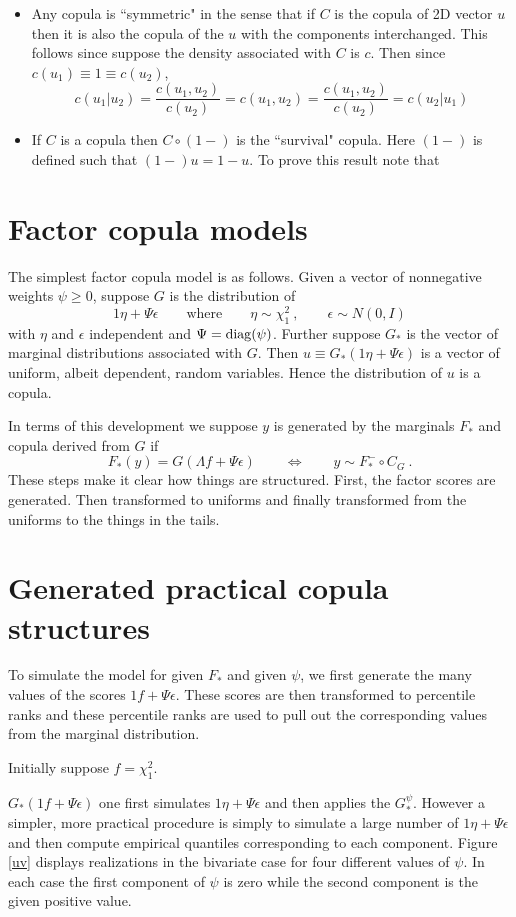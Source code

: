 \documentclass[a4paper,12pt]{article}
\newcommand{\eps}{\epsilon}
\newcommand{\diag}{{\rm diag}}
\begin{document}
\begin{itemize}
\item  Any copula is ``symmetric" in the sense that if $C$ is the copula of 2D vector $u$ then it is also the copula of the $u$ with the components interchanged.  This follows since suppose the density associated with $C$ is $c$.   Then since $c(u_1)\equiv 1\equiv c(u_2)$,
$$
c(u_1|u_2) = \frac{c(u_1,u_2)}{c(u_2)} =c(u_1,u_2) =\frac{c(u_1,u_2)}{c(u_2)}= c(u_2|u_1)
$$

\item If $C$ is a copula then $C\circ (1-)$ is the ``survival" copula.  Here $(1-)$ is defined such that $(1-)u=1-u$.  To prove this result note that
\end{itemize}

\section{Factor copula models}
The simplest factor copula model is as follows. Given a vector of nonnegative weights $\psi\ge 0$, suppose $G$ is the distribution of
$$
1\eta+\Psi\eps\qquad\mathrm{where}\qquad \eta\sim\chi^2_1\ , \qquad \eps\sim N(0,I)
$$ with $\eta$ and $\eps$ independent and $\Psi=\diag(\psi)$.  Further suppose $G_*$ is the vector of marginal distributions associated with $G$.   Then $u\equiv G_*(1\eta+\Psi\eps)$ is a vector of uniform, albeit dependent, random variables. Hence the distribution of  $u$ is a copula.

In terms of this development we suppose $y$ is generated by the marginals $F_*$ and copula derived from $G$ if
$$
F_*(y) =  G(\Lambda f +\Psi\eps)\qquad\Leftrightarrow\qquad y\sim F_*^-\circ C_G \ .
$$
These steps make it clear how things are structured.  First, the factor scores are generated.  Then transformed to uniforms and finally transformed from the uniforms to the things in the tails.

\section{Generated practical copula structures}
To simulate the model for given $F_*$ and given $\psi$, we first generate the many values of the scores $1f+\Psi\eps$. These scores are then transformed to percentile ranks and these percentile ranks are used to pull out the corresponding values from the marginal distribution.

Initially suppose $f=\chi^2_1$.


 $G_*(1f+\Psi\eps)$ one first simulates $1\eta+\Psi\eps$ and then applies the  $G_*^\psi$.  However a simpler, more practical procedure is simply to simulate a large number of $1\eta+\Psi\eps$ and then compute empirical quantiles corresponding to each component.  Figure \ref{uv} displays realizations in the bivariate case for four different values of $\psi$.   In each case the first component of $\psi$ is zero while the second component is the given positive value.
\end{document}
